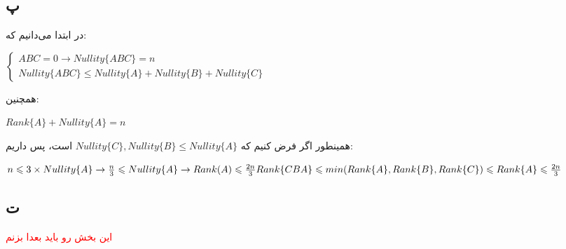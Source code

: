 \subsection*{پ}
در ابتدا می‌دانیم که:

\setLTR

$
\begin{cases}
	ABC = 0 \rightarrow Nullity\{ABC\} = n \\ 
	Nullity\{ABC\} \leq Nullity\{A\} + Nullity\{B\} + Nullity\{C\}
\end{cases}
$
\setRTL

همچنین:
\setLTR

$
Rank\{A\} + Nullity\{A\} = n 
$
\setRTL

همینطور اگر فرض کنیم که
$Nullity\{C\} , Nullity\{B\} \leq Nullity\{A\}$
است، پس داریم:

\setLTR

$
n \leq 3 \times Nullity\{A\} \rightarrow \frac{n}{3} \leq Nullity\{A\} \rightarrow 
Rank(A) \leq \frac{2n}{3} \\ 
Rank\{CBA\} \leq min(Rank\{A\},Rank\{B\},Rank\{C\}) \leq Rank\{A\} \leq \frac{2n}{3}
$

\setRTL

\subsection*{ت}

\textcolor{red}{
	این بخش رو باید بعدا بزنم
}